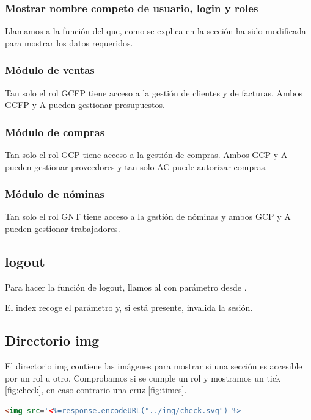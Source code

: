 \documentclass[10pt,a4paper]{article}
\begin{document}
\subsubsection*{Mostrar nombre competo de usuario, login y roles}
Llamamos a la función  del  que, como se explica en la sección  ha sido modificada para mostrar los datos requeridos.


\subsubsection*{Módulo de ventas}
Tan solo el rol GCFP tiene acceso a la gestión de clientes y de facturas. Ambos GCFP y A pueden gestionar presupuestos.


\subsubsection*{Módulo de compras}
Tan solo el rol GCP tiene acceso a la gestión de compras. Ambos GCP y A pueden gestionar proveedores y tan solo AC puede autorizar compras.


\subsubsection*{Módulo de nóminas}
Tan solo el rol GNT tiene acceso a la gestión de nóminas y ambos GCP y A pueden gestionar trabajadores.



\subsection*{logout}
Para hacer la función de logout, llamos al  con parámetro  desde .

El index recoge el parámetro y, si está presente, invalida la sesión.



\subsection*{Directorio img}
El directorio img contiene las imágenes para mostrar si una sección es accesible por un rol u otro. Comprobamos si se cumple un rol y mostramos un tick \ref{fig:check}, en caso contrario una cruz \ref{fig:times}.
\begin{lstlisting}[language=HTML]
<img src='<%=response.encodeURL("../img/check.svg") %>
\end{lstlisting}
\end{document}
